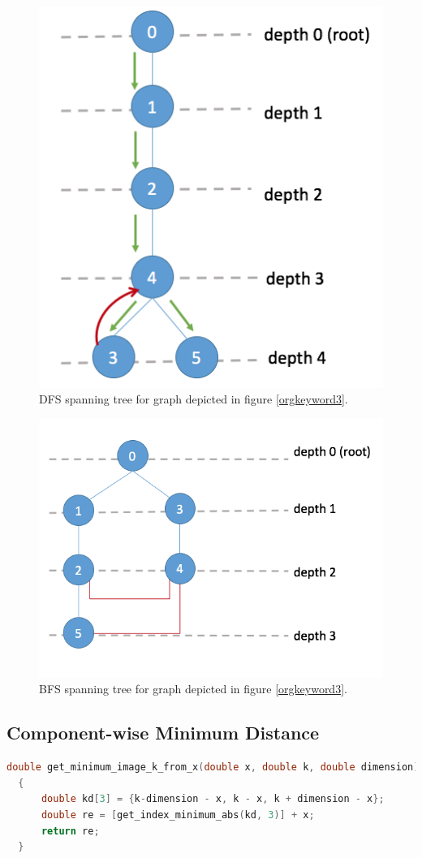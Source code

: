 \documentclass[10pt, a4paper]{article}
\begin{document}
\begin{appendices}
\begin{figure}
\centering
\includegraphics[width=.5\linewidth]{../data_structure/spanning_tree_DFS.png}
\caption{DFS spanning tree for graph depicted in figure \ref{orgkeyword3}.}
\label{orgkeyword4}
\end{figure}

\begin{figure}
\centering
\includegraphics[width=.5\linewidth]{../data_structure/spanning_tree_BFS.png}
\caption{BFS spanning tree for graph depicted in figure \ref{orgkeyword3}.}
\label{orgkeyword5}
\end{figure}




\subsection{Component-wise Minimum Distance}
\label{sec:orgheadline17}
\begin{lstlisting}[language=C++,frame=single,numbers=none]
  double get_minimum_image_k_from_x(double x, double k, double dimension)
  {
      double kd[3] = {k-dimension - x, k - x, k + dimension - x};
      double re = [get_index_minimum_abs(kd, 3)] + x;
      return re;
  }
\end{lstlisting}


\end{appendices}
\end{document}
